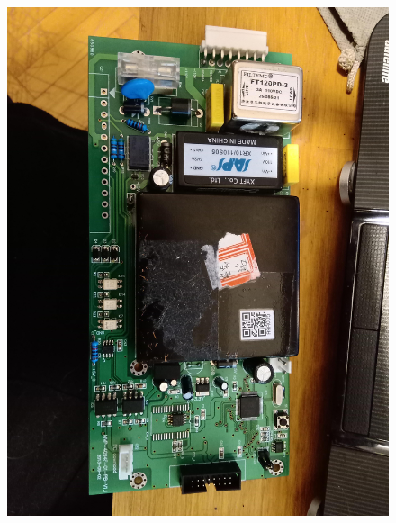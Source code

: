 \documentclass[
11pt, %
]{charter}
\begin{document}
\begin{figure}[htpb]
\centering 
\includegraphics[width=1\textwidth]{./Pics/IMG_20210523_190031.jpg}
\caption{}
\label{fig:Placa de control de repuesto.}
\end{figure}
\end{document}
